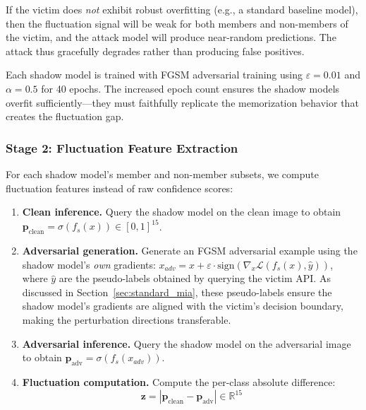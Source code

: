 \documentclass[conference]{IEEEtran}
\begin{document}
If the victim does \textit{not} exhibit robust overfitting (e.g., a standard baseline model), then the fluctuation signal will be weak for both members and non-members of the victim, and the attack model will produce near-random predictions. The attack thus gracefully degrades rather than producing false positives.

Each shadow model is trained with FGSM adversarial training using $\varepsilon = 0.01$ and $\alpha = 0.5$ for 40 epochs. The increased epoch count ensures the shadow models overfit sufficiently---they must faithfully replicate the memorization behavior that creates the fluctuation gap.

\subsubsection{Stage 2: Fluctuation Feature Extraction}

For each shadow model's member and non-member subsets, we compute fluctuation features instead of raw confidence scores:

\begin{enumerate}[leftmargin=*]
    \item \textbf{Clean inference.} Query the shadow model on the clean image to obtain $\mathbf{p}_{\text{clean}} = \sigma(f_s(x)) \in [0, 1]^{15}$.
    
    \item \textbf{Adversarial generation.} Generate an FGSM adversarial example using the shadow model's \textit{own} gradients: $x_{adv} = x + \varepsilon \cdot \text{sign}(\nabla_x \mathcal{L}(f_s(x), \hat{y}))$, where $\hat{y}$ are the pseudo-labels obtained by querying the victim API. As discussed in Section~\ref{sec:standard_mia}, these pseudo-labels ensure the shadow model's gradients are aligned with the victim's decision boundary, making the perturbation directions transferable.
    
    \item \textbf{Adversarial inference.} Query the shadow model on the adversarial image to obtain $\mathbf{p}_{\text{adv}} = \sigma(f_s(x_{adv}))$.
    
    \item \textbf{Fluctuation computation.} Compute the per-class absolute difference:
    \begin{equation}
        \mathbf{z} = |\mathbf{p}_{\text{clean}} - \mathbf{p}_{\text{adv}}| \in \mathbb{R}^{15}
    \end{equation}
\end{enumerate}
\end{document}
